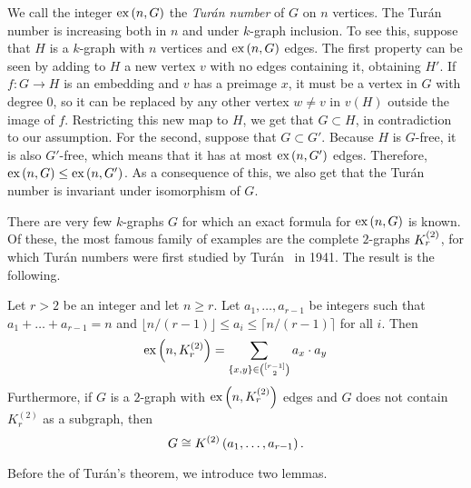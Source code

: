 We call the integer $\text{ex} \left( n, G \right)$ the \emph{Turán number} of $G$ on $n$ vertices.
The Turán number is increasing both in $n$ and under $k$-graph inclusion. %
To see this, suppose that $H$ is a $k$-graph with $n$ vertices and $\text{ex} \left( n, G \right)$ edges.
The first property can be seen by adding to $H$ a new vertex $v$ with no edges containing it, obtaining $H'$.
If $f: G \to H$ is an embedding and $v$ has a preimage $x$, it must be a vertex in $G$ with degree $0$,
so it can be replaced by any other vertex $w \neq v$ in $v(H)$ outside the image of $f$.
Restricting this new map to $H$, we get that $G \subset H$, in contradiction to our assumption.
For the second, suppose that $G \subset G'$.
Because $H$ is $G$-free, it is also $G'$-free, which means that it has at most $\text{ex} \left( n, G' \right)$ edges.
Therefore, $\text{ex} \left( n, G \right) \leq \text{ex} \left( n, G' \right)$.
As a consequence of this, we also get that the Turán number is invariant under isomorphism of $G$.

There are very few $k$-graphs $G$ for which an exact formula for $\text{ex} \left( n, G \right)$ is known.
Of these, the most famous family of examples are the complete $2$-graphs $K^{(2)}_{r}$,
for which Turán numbers were first studied by Turán~\cite{Turan1941} in 1941.
The result is the following.

\begin{theorem}
    \label{thm:turan}
    Let $r > 2$ be an integer and let $n \geq r$.
    Let $a_1, \dots, a_{r-1}$ be integers such that $a_1 + \dots + a_{r-1} = n$
    and $\lfloor n / (r-1) \rfloor \leq a_i \leq \lceil n / (r-1) \rceil$ for all $i$.
    Then
    \begin{equation} \label{eq:turan}
        \text{ex} \left( n, K^{(2)}_{r} \right) = \sum_{\{x, y\} \in \binom{[r-1]}{2}} a_x \cdot a_y
    \end{equation}
    Furthermore, if $G$ is a $2$-graph with $\text{ex} \left( n, K^{(2)}_{r} \right)$ edges
    and $G$ does not contain $K_r^{(2)}$ as a subgraph, then
    \[
        G\cong K^{(2)}\left(a_1, \dots, a_{r-1}\right).
    \]

\end{theorem}

Before the  of Turán's theorem, we introduce two lemmas.

